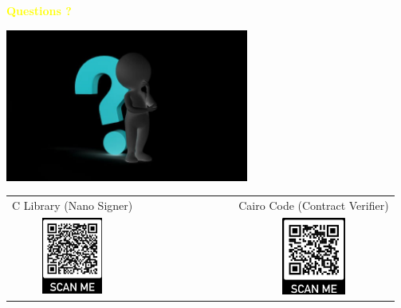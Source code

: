 \documentclass[aspectratio=43]{beamer}
\begin{document}
    \section{}
    \begin{frame}{}
        \centering
            {\Huge\bfseries
        \textcolor{yellow}{Questions ?}}
        
            \includegraphics[width=8cm]{images/questions.jpg}
            
            \begin{tabular}{ccc}
           C Library (Nano Signer) &~~~~~~~~~~~~~~~ &   Cairo Code (Contract Verifier)\\
            
           \includegraphics[width=2cm]{images/musig2_qr.jpg} & ~~~~~~~~~~~~~~~&\includegraphics[width=2.1cm]{images/cairomusig2_qr.jpg}
            \\
           \end{tabular}     		
    \end{frame}
\end{document}
